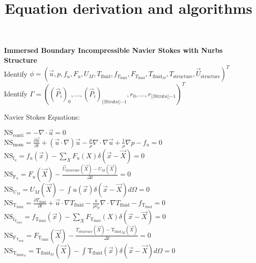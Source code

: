 \documentclass[10pt]{article} %
\title{Equation derivation and algorithms}
\date{}
\begin{document}
	\maketitle

\begin{center}
	\textbf{ Immersed Boundary Incompressible Navier Stokes with Nurbs Structure}\\
	Identify $\phi= \left(\vec{u},p,f_u,F_u,U_M,T_{\text{fluid}},f_{T_{\text{fluid}}},F_{T_{\text{fluid}}},T_{\text{fluid}_M},T_{\text{structure}},\vec{U}_\text{structure}\right)^T$\\
	Identify $\Gamma= \left((\vec{P}_{i})_0,...,(\vec{P}_{i})_{\lvert\lvert \text{Struts}\lvert\lvert-1},r_0,...,r_{\lvert\lvert \text{Struts}\lvert\lvert-1} \right)^T$\\
\begin{flushleft}
	Navier Stokes Equations:
\end{flushleft}
	$ \text{NS}_{\text{conti}} =- \nabla \cdot \vec{u} = 0$\\
	$ \text{NS}_{\text{mom}} = \frac{\partial \vec{u}}{\partial t} + (\vec{u} \cdot \nabla) \vec{u} - \frac{\mu}{\rho} \nabla \cdot \nabla \vec{u} + \frac{1}{\rho} \nabla p - f_u = 0$\\
	$\text{NS}_{\text{f}_u} = f_u (\vec{x}) - \sum_{X} F_u (X) \delta (\vec{x}-\vec{X}) = 0$\\
	$\text{NS}_{\text{F}_u} = F_u (\vec{X}) - \frac{\vec{U}_\text{structure} (\vec{X}) - U_M(\vec{X})}{\Delta t} = 0$\\
	$\text{NS}_{\text{U}_M} = U_M (\vec{X}) - \int u(\vec{x}) \delta(\vec{x}-\vec{X}) d \Omega= 0$\\
	$\text{NS}_{\text{T}_{\text{fluid}}} = \frac{\partial T_{\text{fluid}}}{\partial t} + \vec{u} \cdot \nabla T_{\text{fluid}} - \frac{\kappa}{\rho c_p} \nabla \cdot \nabla T_{\text{fluid}} - f_{\text{T}_{\text{fluid}}} = 0$\\
	$\text{NS}_{\text{f}_{\text{T}_{\text{fluid}}}} = f_{\text{T}_{\text{fluid}}} (\vec{x}) - \sum_{X} F_{\text{T}_{\text{fluid}}} (X) \delta (\vec{x}-\vec{X}) = 0$\\
	$\text{NS}_{\text{F}_{\text{T}_{\text{fluid}}}} = F_{\text{T}_{\text{fluid}}} (\vec{X}) - \frac{T_{\text{structure}} (\vec{X}) - {\text{T}_{\text{fluid}}}_M(\vec{X})}{\Delta t} = 0$\\
	$\text{NS}_{\text{T}_{\text{fluid}_M}} = \text{T}_{\text{fluid}_M} (\vec{X}) - \int {\text{T}_{\text{fluid}}}(\vec{x}) \delta(\vec{x}-\vec{X}) d \Omega= 0$\\

\end{center}
\end{document}
